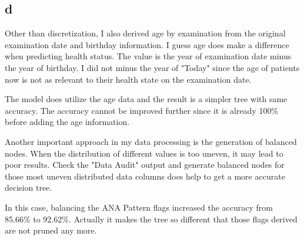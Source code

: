\documentclass[12pt]{article}
\begin{document}
\subsection{d} %
\label{sub:4d}
Other than discretization, I also derived age by examination from the original examination date and birthday information. I guess age does make a difference when predicting health status. The value is the year of examination date minus the year of birthday. I did not minus the year of "Today" since the age of patients now is not as relevant to their health state on the examination date.

The model does utilize the age data and the result is a simpler tree with same accuracy. The accuracy cannot be improved further since it is already 100\% before adding the age information.

Another important approach in my data processing is the generation of balanced nodes. When the distribution of different values is too uneven, it may lead to poor results. Check the "Data Audit" output and generate balanced nodes for those most uneven distributed data columns does help to get a more accurate decision tree.

In this case, balancing the ANA Pattern flags increased the accuracy from 85.66\% to 92.62\%. Actually it makes the tree so different that those flags derived are not pruned any more.
\end{document}
